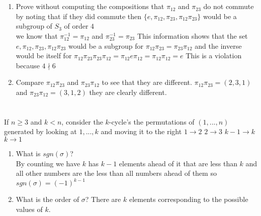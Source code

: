 \documentclass{article}
\begin{document}
    \section{}
    \begin{enumerate}
    \item 
        Prove without computing the compositions that $\pi_{12}$ and  $\pi_{23}$ do not commute
    by noting that if they did commute then $\{e, \pi_{12}, \pi_{23}, \pi_{12}\pi_{23}\}$ would be a subgroup of $S_3$ of order $4$ 
    \\
    we know that $\pi_{12}^{-1} = \pi_{12}$ and $\pi_{23}^{-1} = \pi_{23}$
    This information shows that the set $e, \pi_{12}, \pi_{23}, \pi_{12}\pi_{23}$ would be a subgroup
    for $\pi_{12}\pi_{23} = \pi_{23}\pi_{12}$ and the inverse would be itself for $\pi_{12}\pi_{23}\pi_{23}\pi_{12} = \pi_{12}e\pi_{12} = \pi_{12}\pi_{12} = e$
    This is a violation because $4 \nmid 6$  

    \item
    Compare $\pi_{12}\pi_{23}$ and $\pi_{23}\pi_{12}$ to see that they are different.
    $\pi_{12}\pi_{23} = (2,3,1)$ and $\pi_{23}\pi_{12} = (3,1,2)$
    they are clearly different.

 
    \end{enumerate}

    \section{}
    If $n \ge 3$ and $k < n$, consider the $k$-cycle's the permutations of  $(1,...,n)$ 
    generated by looking at $1,...,k$ and moving it to the right $1\rightarrow 2$ $2\rightarrow 3$  $k-1 \rightarrow k$ $k \rightarrow 1$ 
    \begin{enumerate}
        \item What is $sgn(\sigma )$?
            \\
            By counting we have $k$ has $k-1$ elements ahead of it that are less than $k$ and all other numbers are the less than all numbers ahead of them
            so $sgn(\sigma ) = (-1)^{k-1}$
        \item What is the order of $\sigma$?
            There are $k$ elements corresponding to the possible values of $k$.
    \end{enumerate}
    
\end{document}
